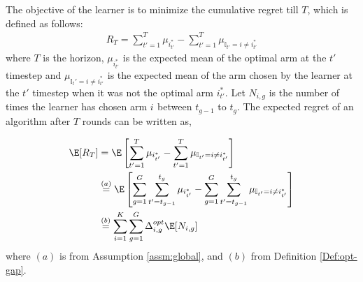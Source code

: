 The objective of the learner is to minimize the cumulative regret till $T$, which is defined as follows:
\begin{align*}
R_{T}=\sum_{t'=1}^T \mu_{i^*_{t'}} - \sum_{t'=1}^T \mu_{\mathbb{I}_{t'} = i \neq i^*_{t'}}
\end{align*}
where $T$ is the horizon, $\mu_{i^*_{t'}}$ is the expected mean of the optimal arm at the $t'$ timestep and $\mu_{\mathbb{I}_t' = i \neq i^*_{t'}}$ is the expected mean of the arm chosen by the learner at the $t'$ timestep when it was not the optimal arm $i^*_{t'}$. Let $N_{i,g}$ is the number of times the learner has chosen arm $i_{}$ between $t_{g-1}$ to $t_{g}$. The expected regret of an algorithm after $T$ rounds can be written as,

\begin{align*}
\E[R_{T}] &= \E\left[\sum_{t'=1}^T \mu_{i^*_{t'}} - \sum_{t'=1}^T \mu_{\mathbb{I}_{t'} = i \neq i^*_{t'}}\right]\\
&\overset{(a)}{=} \E\left[\sum_{g=1}^{G}\sum_{t'=t_{g-1}}^{t_{g}} \mu_{i^*_{t'}} - \sum_{g=1}^{G}\sum_{t'=t_{g-1}}^{t_{g}} \mu_{\mathbb{I}_{t'} = i \neq i^*_{t'}}\right]\\
&\overset{(b)}{=}\sum_{i = 1}^K\sum_{g=1}^{G}\Delta^{opt}_{i,g}\E[N_{i,g}]
\end{align*}
where $(a)$ is from Assumption \ref{assm:global}, and $(b)$ from Definition \ref{Def:opt-gap}. 

